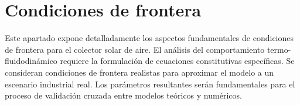 \section{Condiciones de frontera}
\label{sec:cap07_condiciones}

Este apartado expone detalladamente los aspectos fundamentales de condiciones de frontera para el colector solar de aire.
El análisis del comportamiento termo-fluidodinámico requiere la formulación de ecuaciones constitutivas específicas.
Se consideran condiciones de frontera realistas para aproximar el modelo a un escenario industrial real.
Los parámetros resultantes serán fundamentales para el proceso de validación cruzada entre modelos teóricos y numéricos.
